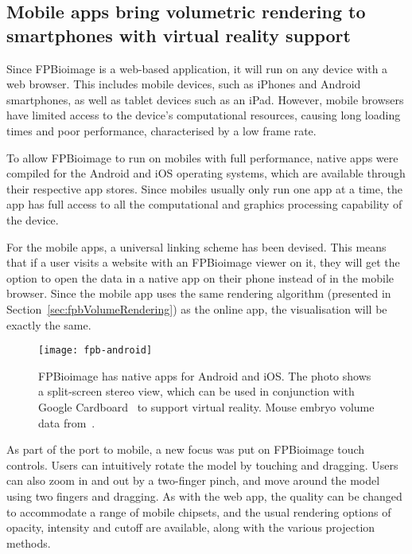 \subsection{Mobile apps bring volumetric rendering to smartphones with virtual reality support}
Since FPBioimage is a web-based application, it will run on any device with a web browser. 
This includes mobile devices, such as iPhones and Android smartphones, as well as tablet devices such as an iPad. 
However, mobile browsers have limited access to the device's computational resources, causing long loading times and poor performance, characterised by a low frame rate. 

To allow FPBioimage to run on mobiles with full performance, native apps were compiled for the Android and iOS operating systems, which are available through their respective app stores. 
Since mobiles usually only run one app at a time, the app has full access to all the computational and graphics processing capability of the device. 

For the mobile apps, a universal linking scheme has been devised. 
This means that if a user visits a website with an FPBioimage viewer on it, they will get the option to open the data in a native app on their phone instead of in the mobile browser. 
Since the mobile app uses the same rendering algorithm (presented in Section~\ref{sec:fpbVolumeRendering}) as the online app, the visualisation will be exactly the same. 

\begin{figure}[htbp!]
\centering
\texttt{[image: fpb-android]}
\caption[FPBioimage: The FPBioimage mobile app provides volumetric rendering in virtual reality]{FPBioimage has native apps for Android and iOS. The photo shows a split-screen stereo view, which can be used in conjunction with Google Cardboard~\cite{cardboard} to support virtual reality. Mouse embryo volume data from~\cite{sharpe2002optical}. } %
\label{fig:fpbMobile}
\end{figure}

As part of the port to mobile, a new focus was put on FPBioimage touch controls. 
Users can intuitively rotate the model by touching and dragging. 
Users can also zoom in and out by a two-finger pinch, and move around the model using two fingers and dragging. 
As with the web app, the quality can be changed to accommodate a range of mobile chipsets, and the usual rendering options of opacity, intensity and cutoff are available, along with the various projection methods.  

